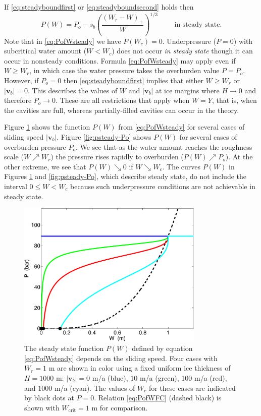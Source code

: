 \documentclass[11pt,final]{amsart}
\newcommand\bv{\mathbf{v}}
\begin{document}
If \eqref{eq:steadyboundfirst} or \eqref{eq:steadyboundsecond} holds then
\begin{equation}
P(W) = P_o - s_b \left(\frac{(W_r - W)_+}{W}\right)^{1/3} \qquad \text{ in steady state}.  \label{eq:PofWsteady}
\end{equation}
Note that in \eqref{eq:PofWsteady} we have $P(W_c)=0$.  Underpressure ($P=0$) with subcritical water amount ($W<W_c$) does not occur \emph{in steady state} though it can occur in nonsteady conditions.  Formula \eqref{eq:PofWsteady} may apply even if $W\ge W_r$, in which case the water pressure takes the overburden value $P = P_o$.  However, if $P_o=0$ then \eqref{eq:steadyboundfirst} implies that either $W\ge W_r$ or $|\bv_b|=0$.  This describes the values of $W$ and $|\bv_b|$ at ice margins where $H\to 0$ and therefore $P_o\to 0$.  These are all restrictions that apply when $W=Y$, that is, when the cavities are full, whereas partially-filled cavities can occur in the \cite{Schoofetal2012} theory.

\newcommand{\upto}{ \!\!\nearrow\! }
\newcommand{\downto}{ \!\searrow\! }
Figure \ref{fig:psteady-vb} shows the function $P(W)$ from \eqref{eq:PofWsteady} for several cases of sliding speed $|\bv_b|$.  Figure \ref{fig:psteady-Po} shows $P(W)$ for several cases of overburden pressure $P_o$.  We see that as the water amount reaches the roughness scale ($W\upto W_r$) the pressure rises rapidly to overburden ($P(W) \upto P_o$).  At the other extreme, we see that $P(W) \downto 0$ if $W \downto W_c$.  The curves $P(W)$ in Figures \ref{fig:psteady-vb} and \ref{fig:psteady-Po}, which describe steady state, do not include the interval $0\le W < W_c$ because such underpressure conditions are not achievable in steady state.

\begin{figure}[ht]
\includegraphics[width=3.5in,keepaspectratio=true]{psteady-vb}
\medskip
\caption{The steady state function $P(W)$ defined by equation \eqref{eq:PofWsteady} depends on the sliding speed.  Four cases with $W_r=1$ m are shown in color using a fixed uniform ice thickness of $H=1000$ m: $|\bv_b|=0$ m/a (blue), $10$ m/a (green), $100$ m/a (red), and $1000$ m/a (cyan).  The values of $W_c$ for these cases are indicated by black dots at $P=0$.  Relation \eqref{eq:PofWFC} (dashed black) is shown with $W_{\text{crit}}=1$ m for comparison.}
\label{fig:psteady-vb}
\end{figure}
\end{document}
